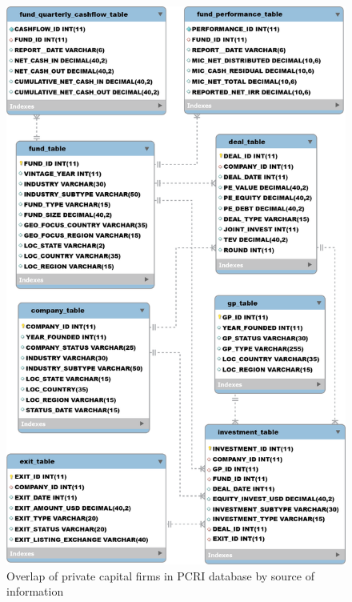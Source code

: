 
\begin{figure}[tb]
    \centering
\includegraphics[width=\widthpcrib]{./figures/pcrifigure2.png}
\caption{Overlap of private capital firms in PCRI database by source of information\label{fig:pcrifigure2}}
\end{figure}
